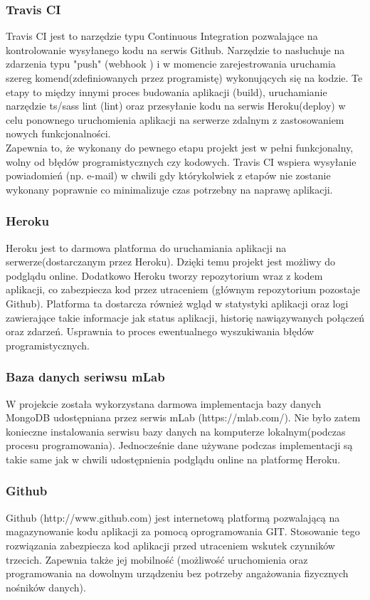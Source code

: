 \documentclass[eng,printmode]{mgr}
\begin{document}
\subsubsection{Travis CI}
Travis CI \cite{TravisCI} jest to narzędzie typu Continuous Integration \cite{Keyword_CI} pozwalające na kontrolowanie wysyłanego kodu na serwis Github. Narzędzie to nasłuchuje na zdarzenia typu "push" (webhook \cite{Keyword_Webhook}) i w momencie zarejestrowania uruchamia szereg komend(zdefiniowanych przez programistę) wykonujących się na kodzie. Te etapy to między innymi proces budowania aplikacji (build), uruchamianie narzędzie ts/sass lint (lint) oraz przesyłanie kodu na serwis Heroku(deploy) w celu ponownego uruchomienia aplikacji na serwerze zdalnym z zastosowaniem nowych funkcjonalności. \\
Zapewnia to, że wykonany do pewnego etapu projekt jest w pełni funkcjonalny, wolny od błędów programistycznych czy kodowych. Travis CI wspiera wysyłanie powiadomień (np. e-mail) w chwili gdy którykolwiek z etapów nie zostanie wykonany poprawnie co minimalizuje czas potrzebny na naprawę aplikacji.

\subsubsection{Heroku}
Heroku\cite{Heroku} jest to darmowa platforma do uruchamiania aplikacji na serwerze(dostarczanym przez Heroku). Dzięki temu projekt jest możliwy do podglądu online. Dodatkowo Heroku tworzy repozytorium wraz z kodem aplikacji, co zabezpiecza kod przez utraceniem (głównym repozytorium pozostaje Github). Platforma ta dostarcza również wgląd w statystyki aplikacji oraz logi zawierające takie informacje jak status aplikacji, historię nawiązywanych połączeń oraz zdarzeń. Usprawnia to proces ewentualnego wyszukiwania błędów programistycznych.

\subsubsection{Baza danych seriwsu mLab}
W projekcie została wykorzystana darmowa implementacja bazy danych MongoDB udostępniana przez serwis mLab (https://mlab.com/). Nie było zatem konieczne instalowania serwisu bazy danych na komputerze lokalnym(podczas procesu programowania). Jednocześnie dane używane podczas implementacji są takie same jak w chwili udostępnienia podglądu online na platformę Heroku.

\subsubsection{Github}
Github (http://www.github.com) jest internetową platformą pozwalającą na magazynowanie kodu aplikacji za pomocą oprogramowania GIT. Stosowanie tego rozwiązania zabezpiecza kod aplikacji przed utraceniem wskutek czynników trzecich. Zapewnia także jej mobilność (możliwość uruchomienia oraz programowania na dowolnym urządzeniu bez potrzeby angażowania fizycznych nośników danych).
\\
\\
\end{document}
